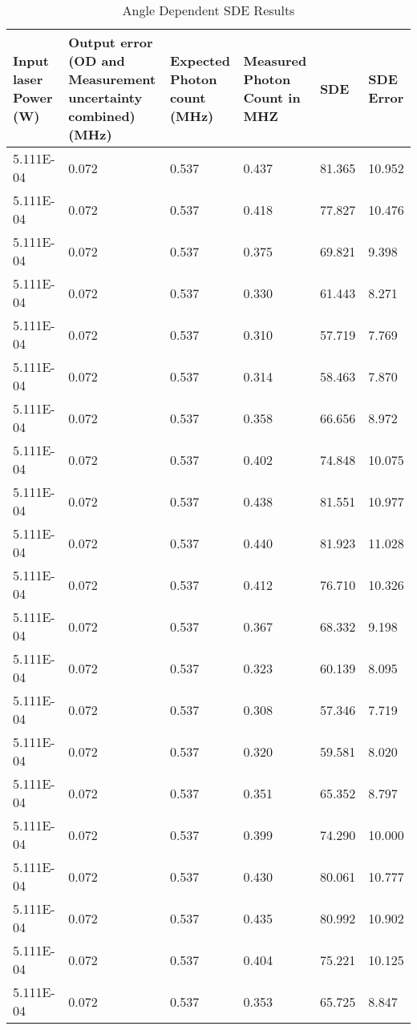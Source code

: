 \begin{table}[!ht]
    \centering
    \begin{tabular}{|l|l|l|l|l|l|}
    \hline
        Input laser Power (W) & Output error (OD and Measurement uncertainty combined) (MHz) & Expected Photon count (MHz) & Measured Photon Count in MHZ & SDE  & SDE Error  \\ \hline
        5.111E-04 & 0.072 & 0.537 & 0.437 & 81.365 & 10.952 \\ \hline
        5.111E-04 & 0.072 & 0.537 & 0.418 & 77.827 & 10.476 \\ \hline
        5.111E-04 & 0.072 & 0.537 & 0.375 & 69.821 & 9.398 \\ \hline
        5.111E-04 & 0.072 & 0.537 & 0.330 & 61.443 & 8.271 \\ \hline
        5.111E-04 & 0.072 & 0.537 & 0.310 & 57.719 & 7.769 \\ \hline
        5.111E-04 & 0.072 & 0.537 & 0.314 & 58.463 & 7.870 \\ \hline
        5.111E-04 & 0.072 & 0.537 & 0.358 & 66.656 & 8.972 \\ \hline
        5.111E-04 & 0.072 & 0.537 & 0.402 & 74.848 & 10.075 \\ \hline
        5.111E-04 & 0.072 & 0.537 & 0.438 & 81.551 & 10.977 \\ \hline
        5.111E-04 & 0.072 & 0.537 & 0.440 & 81.923 & 11.028 \\ \hline
        5.111E-04 & 0.072 & 0.537 & 0.412 & 76.710 & 10.326 \\ \hline
        5.111E-04 & 0.072 & 0.537 & 0.367 & 68.332 & 9.198 \\ \hline
        5.111E-04 & 0.072 & 0.537 & 0.323 & 60.139 & 8.095 \\ \hline
        5.111E-04 & 0.072 & 0.537 & 0.308 & 57.346 & 7.719 \\ \hline
        5.111E-04 & 0.072 & 0.537 & 0.320 & 59.581 & 8.020 \\ \hline
        5.111E-04 & 0.072 & 0.537 & 0.351 & 65.352 & 8.797 \\ \hline
        5.111E-04 & 0.072 & 0.537 & 0.399 & 74.290 & 10.000 \\ \hline
        5.111E-04 & 0.072 & 0.537 & 0.430 & 80.061 & 10.777 \\ \hline
        5.111E-04 & 0.072 & 0.537 & 0.435 & 80.992 & 10.902 \\ \hline
        5.111E-04 & 0.072 & 0.537 & 0.404 & 75.221 & 10.125 \\ \hline
        5.111E-04 & 0.072 & 0.537 & 0.353 & 65.725 & 8.847 \\ \hline
    \end{tabular}
    \caption{Angle Dependent SDE Results \label{tab:angle_dependend_sde_results}}
\end{table}